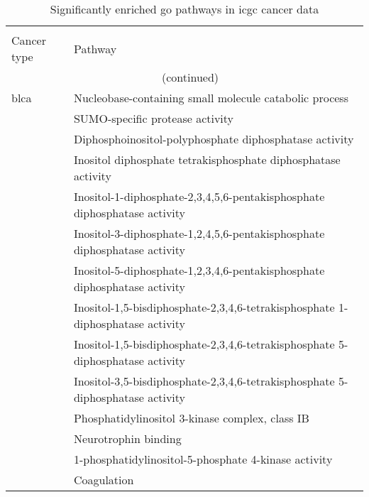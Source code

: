 \begin{appendices}
	\begin{longtable}{lp{}}
		\centering
		\caption[Significantly enriched \gls{go} pathways in \gls{icgc} cancer data]{Significantly enriched \gls{go} pathways in \gls{icgc} cancer data}
		\label{tab:sig_path_go}\\
		Cancer type & Pathway\\
		\endfirsthead
		\multicolumn{2}{c}{\tablename\ \thetable{}\ (continued)} \\
		\hline
		\hline
		\endhead
		\hline
		\hline
		\rule{0pt}{2.25ex}\gls{blca} & Nucleobase-containing small molecule catabolic process                                          \\
									 & SUMO-specific protease activity                                                                 \\
									 & Diphosphoinositol-polyphosphate diphosphatase activity                                          \\
									 & Inositol diphosphate tetrakisphosphate diphosphatase activity                                   \\
									 & Inositol-1-diphosphate-2,3,4,5,6-pentakisphosphate diphosphatase activity                       \\
									 & Inositol-3-diphosphate-1,2,4,5,6-pentakisphosphate diphosphatase activity                       \\
									 & Inositol-5-diphosphate-1,2,3,4,6-pentakisphosphate diphosphatase activity                       \\
									 & Inositol-1,5-bisdiphosphate-2,3,4,6-tetrakisphosphate 1-diphosphatase activity                  \\
									 & Inositol-1,5-bisdiphosphate-2,3,4,6-tetrakisphosphate 5-diphosphatase activity                  \\
									 & Inositol-3,5-bisdiphosphate-2,3,4,6-tetrakisphosphate 5-diphosphatase activity                  \\
									 & Phosphatidylinositol 3-kinase complex, class IB                                                 \\
									 & Neurotrophin binding                                                                            \\
									 & 1-phosphatidylinositol-5-phosphate 4-kinase activity                                            \\
									 & Coagulation                                                                                     \\

\end{longtable}
\end{appendices}

